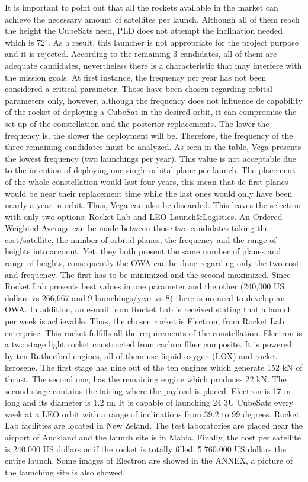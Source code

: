 \newline
It is important to point out that all the rockets available in the market can achieve the necessary amount of satellites per launch. Although all of them reach the height the CubeSats need, PLD does not attempt the inclination needed which is 72$^{\circ}$. As a result, this launcher is not appropriate for the project purpose and it is rejected. 
According to the remaining 3 candidates, all of them are adequate candidates, nevertheless there is a characteristic that may interfere with the mission goals. At first instance, the frequency per year has not been considered a critical parameter. Those have been chosen regarding orbital parameters only, however, although the frequency does not influence de capability of the rocket of deploying a CubeSat in the desired orbit, it can compromise the set up of the constellation and the posterior replacements. The lower the frequency is, the slower the deployment will be. Therefore, the frequency of the three remaining candidates must be analyzed. As seen in the table, Vega presents the lowest frequency (two launchings per year). This value is not acceptable due to the intention of deploying one single orbital plane per launch. The placement of the whole constellation would last four years, this mean that de first planes would be near their replacement time while the last ones would only have been nearly a year in orbit. Thus, Vega can also be discarded. 
This leaves the selection with only two options: Rocket Lab and LEO Launch\&Logistics. An Ordered Weighted Average can be made between those two candidates taking the cost/satellite, the number of orbital planes, the frequency and the range of heights into account. Yet, they both present the same number of planes and range of heights, consequently the OWA can be done regarding only the two cost and frequency. The first has to be minimized and the second maximized. Since Rocket Lab presents best values in one parameter and the other (240,000 US dollars vs 266,667 and 9 launchings/year vs 8) there is no need to develop an OWA. In addition, an e-mail from Rocket Lab is received stating that a launch per week is achievable. Thus, the chosen rocket is Electron, from Rocket Lab enterprise. This rocket fulfills all the requirements of the constellation. 
\newline
Electron is a two stage light rocket constructed from carbon fiber composite. It is powered by ten Rutherford engines, all of them use liquid oxygen (LOX) and rocket kerosene. The first stage has nine out of the ten engines which generate 152 kN of thrust. The second one, has the remaining engine which produces 22 kN. The second stage contains the fairing where the payload is placed. Electron is 17 m long and its diameter is 1.2 m. It is capable of launching 24 3U CubeSats every week at a LEO orbit with a range of inclinations from 39.2 to 99 degrees. 
Rocket Lab facilities are located in New Zeland. The test laboratories are placed near the airport of Auckland and the launch site is in Mahia.
Finally, the cost per satellite is 240.000 US dollars or if the rocket is totally filled, 5.760.000 US dollars the entire launch. Some images of Electron are showed in the ANNEX, a picture of the launching site is also showed. 



